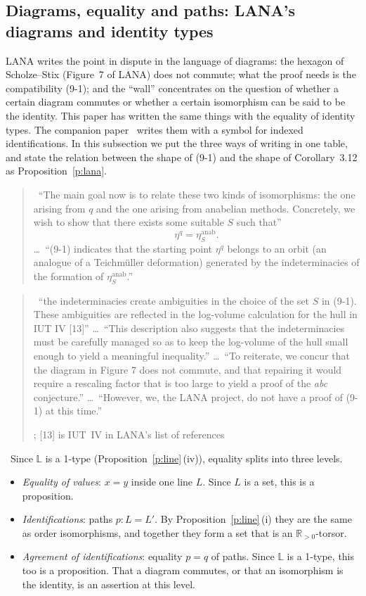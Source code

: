 \documentclass[11pt,a4paper]{article}
\newcommand{\Rp}{\mathbb{R}_{>0}}
\newcommand{\LL}{\mathbb{L}}
\newcommand{\lab}[2]{{\upshape\fcolorbox{#1}{#1!8}{\scriptsize\sffamily\bfseries\textcolor{#1}{#2}}}}
\newcommand{\tagX}{\lab{Plum}{X}}
\newcommand{\tagH}{\lab{BurntOrange}{H}}
\newcommand{\xquote}[2]{\begin{quote}\small\tagX\ #1\par\nopagebreak\hfill{\footnotesize #2}\end{quote}}
\newcommand{\q}[1]{``#1''}
\theoremstyle{plain}
\theoremstyle{definition}
\theoremstyle{remark}
\begin{document}
\subsection{Diagrams, equality and paths: LANA's diagrams and identity types}\label{ss:lana}
LANA writes the point in dispute in the language of diagrams: the hexagon of Scholze--Stix (Figure~7 of LANA) does not
commute; what the proof needs is the compatibility (9-1); and the \q{wall} concentrates on the question of whether a
certain diagram commutes or whether a certain isomorphism can be said to be the identity. This paper has written the
same things with the equality of identity types. The companion paper~\cite{UE} writes them with a symbol for indexed
identifications. In this subsection we put the three ways of writing in one table, and state the relation between the
shape of (9-1) and the shape of Corollary~3.12 as Proposition~\ref{p:lana}.

\xquote{\q{The main goal now is to relate these two kinds of isomorphisms: the one arising from $q$ and the one arising from
anabelian methods. Concretely, we wish to show that there exists some suitable $S$ such that}
\[\eta^q=\eta^{\mathrm{anab}}_S.\tag{9-1}\]
\dots\ \q{(9-1) indicates that the starting point $\eta^q$ belongs to an orbit
(an analogue of a Teichm\"uller deformation) generated by the indeterminacies of the formation of
$\eta^{\mathrm{anab}}_S$.}}{\cite[\S9.2, \S9.3]{LANA}}

\xquote{\q{the indeterminacies create ambiguities in the choice of the set $S$ in (9-1). These ambiguities are reflected in the
log-volume calculation for the hull in IUT IV [13]} \dots\ \q{This description also suggests that the indeterminacies must
be carefully managed so as to keep the log-volume of the hull small enough to yield a meaningful inequality.} \dots\ \q{To
reiterate, we concur that the diagram in Figure 7 does not commute, and that repairing it would require a rescaling factor
that is too large to yield a proof of the \textit{abc} conjecture.} \dots\ \q{However, we, the LANA project, do not have a
proof of (9-1) at this time.}}{\cite[\S10.4, \S10.5]{LANA}; [13] is IUT~IV in LANA's list of references}

\tagH\ Since $\LL$ is a 1-type (Proposition~\ref{p:line}\,(iv)), equality splits into three levels.
\begin{itemize}
\item \emph{Equality of values}: $x=y$ inside one line $L$. Since $L$ is a set, this is a proposition.
\item \emph{Identifications}: paths $p:L=L'$. By Proposition~\ref{p:line}\,(i) they are the same as order
isomorphisms, and together they form a set that is an $\Rp$-torsor.
\item \emph{Agreement of identifications}: equality $p=q$ of paths. Since $\LL$ is a 1-type, this too is a
proposition. That a diagram commutes, or that an isomorphism is the identity, is an assertion at this level.
\end{itemize}
\end{document}
